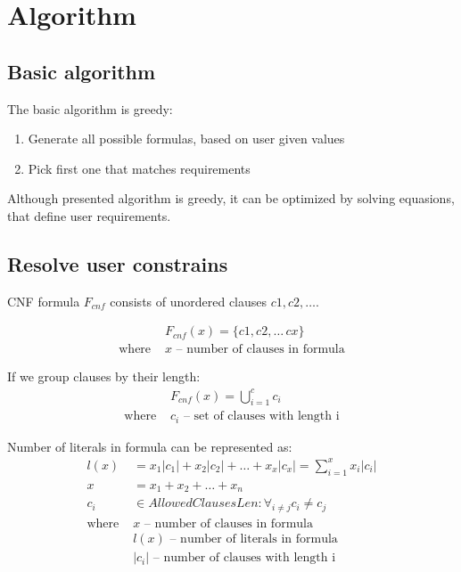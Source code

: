 \chapter{Algorithm}

\section{Basic algorithm}

The basic algorithm is greedy:
\begin{enumerate}
	\item Generate all possible formulas, based on user given values
	\item Pick first one that matches requirements
\end{enumerate}

Although presented algorithm is greedy, it can be optimized by solving equasions, that define user requirements.

\section{Resolve user constrains}

CNF formula $F_{cnf}$ consists of unordered clauses $c1, c2, \dots$. 

\begin{align*}
	&F_{cnf}(x) = \{c1, c2, \dots\, cx\} \\
	\text{where }
		&x \text{ -- number of clauses in formula}
\end{align*}

If we group clauses by their length:
\begin{align*}
	&F_{cnf}(x) = \bigcup_{i=1}^c c_i \\
	\text{where }
		&c_i \text{ -- set of clauses with length i}
\end{align*}

Number of literals in formula can be represented as:
\begin{align*}
	l(x) &= x_1|c_1| + x_2|c_2| + \dots + x_x|c_x| = \sum_{i=1}^{x} x_i |c_i| \\
	x &= x_1 + x_2 + \dots + x_n \\
	c_i &\in AllowedClausesLen: \forall_{i \neq j} c_i \neq c_j  \\
	\text{where }
		&x \text{ -- number of clauses in formula} \\
		&l(x) \text{ -- number of literals in formula} \\
		&|c_i| \text{ -- number of clauses with length i} \\
\end{align*}


